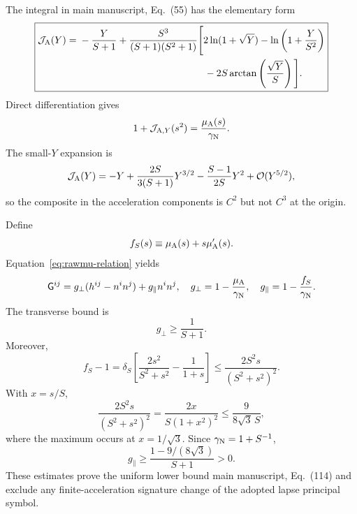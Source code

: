 \documentclass[aps,prd,reprint,onecolumn,notitlepage,nofootinbib,longbibliography,floatfix]{revtex4-2}
\theoremstyle{scstyle}
\theoremstyle{definition}
\theoremstyle{remark}
\newcommand{\cJ}{\mathcal J}
\newcommand{\cO}{\mathcal O}
\begin{document}
The integral in main manuscript, Eq.~(55) has the elementary form
\begin{equation}
\boxed{\begin{aligned}
\cJ_{\rm A}(Y)={}&-\frac{Y}{S+1}
+\frac{S^3}{(S+1)(S^2+1)}
\Bigg[
2\ln(1+\sqrt Y)
-\ln\left(1+\frac{Y}{S^2}\right)\\
&\hspace{4.5cm}
-2S\arctan\left(\frac{\sqrt Y}{S}\right)
\Bigg].
\end{aligned}}
\label{eq:benchmarkJclosed}
\end{equation}
Direct differentiation gives
\begin{equation}
1+\cJ_{{\rm A},Y}(s^2)
=\frac{\mu_{\rm A}(s)}{\gamma_{\rm N}}.
\label{eq:rawmu-relation}
\end{equation}
The small-$Y$ expansion is
\begin{equation}
\cJ_{\rm A}(Y)
=-Y+\frac{2S}{3(S+1)}Y^{3/2}
-\frac{S-1}{2S}Y^2+\cO(Y^{5/2}),
\label{eq:newJsmall}
\end{equation}
so the composite in the acceleration components is $C^2$ but not $C^3$ at the origin.

Define
\begin{equation}
f_S(s)\equiv\mu_{\rm A}(s)+s\mu_{\rm A}'(s).
\label{eq:fS}
\end{equation}
Equation~\eqref{eq:rawmu-relation} yields
\begin{equation}
\mathsf G^{ij}
=g_\perp(h^{ij}-n^in^j)+g_\parallel n^in^j,
\quad
g_\perp=1-\frac{\mu_{\rm A}}{\gamma_{\rm N}},
\quad
g_\parallel=1-\frac{f_S}{\gamma_{\rm N}}.
\label{eq:Geigendecomposition}
\end{equation}
The transverse bound is
\begin{equation}
g_\perp\ge\frac{1}{S+1}.
\label{eq:gperpbound}
\end{equation}
Moreover,
\begin{equation}
f_S-1
=\delta_S\left[
\frac{2s^2}{S^2+s^2}-\frac{1}{1+s}
\right]
\le\frac{2S^2s}{(S^2+s^2)^2}.
\label{eq:fSbound1}
\end{equation}
With $x=s/S$,
\begin{equation}
\frac{2S^2s}{(S^2+s^2)^2}
=\frac{2x}{S(1+x^2)^2}
\le\frac{9}{8\sqrt3\,S},
\label{eq:fSbound2}
\end{equation}
where the maximum occurs at $x=1/\sqrt3$. Since $\gamma_{\rm N}=1+S^{-1}$,
\begin{equation}
g_\parallel
\ge\frac{1-9/(8\sqrt3)}{S+1}>0.
\label{eq:gparallelbound}
\end{equation}
These estimates prove the uniform lower bound main manuscript, Eq.~(114) and exclude any finite-acceleration signature change of the adopted lapse principal symbol.
\end{document}
